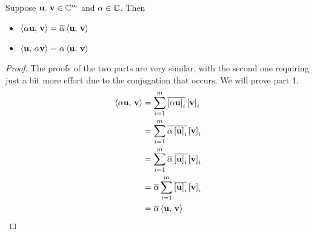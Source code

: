 \documentclass{ximera}
\begin{document}
\begin{theorem}
\label{theorem:IPSM}

Suppose $\mathbf{u},\,\mathbf{v}\in\mathbb{C}^{m}$ and $\alpha\in\mathbb{C}$.  Then
\begin{itemize}
\item $\left\langle\alpha\mathbf{u},\,\mathbf{v}\right\rangle=\overline{\alpha}\left\langle\mathbf{u},\,\mathbf{v}\right\rangle$
\item $\left\langle\mathbf{u},\,\alpha\mathbf{v}\right\rangle=\alpha\left\langle\mathbf{u},\,\mathbf{v}\right\rangle$
\end{itemize}

\begin{proof}
  The proofs of the two parts are very similar, with the second one requiring just a bit more effort due to the conjugation that occurs.  We will prove part 1.
  \begin{align*}
    \innerproduct{\alpha\vect{u}}{\vect{v}}
    &=\sum_{i=1}^{m}\conjugate{\vectorentry{\alpha\vect{u}}{i}}\vectorentry{\vect{v}}{i}
    \\ %
    &=\sum_{i=1}^{m}\conjugate{\alpha\vectorentry{\vect{u}}{i}}\vectorentry{\vect{v}}{i}
    \\ %
    &=\sum_{i=1}^{m}\conjugate{\alpha}\,\conjugate{\vectorentry{\vect{u}}{i}}\vectorentry{\vect{v}}{i}
    \\ %
    &=\conjugate{\alpha}\sum_{i=1}^{m}\conjugate{\vectorentry{\vect{u}}{i}}\vectorentry{\vect{v}}{i}
    \\ %
    &=\conjugate{\alpha}\innerproduct{\vect{u}}{\vect{v}}
    \\ %
  \end{align*}
\end{proof}
\end{theorem}
\end{document}
